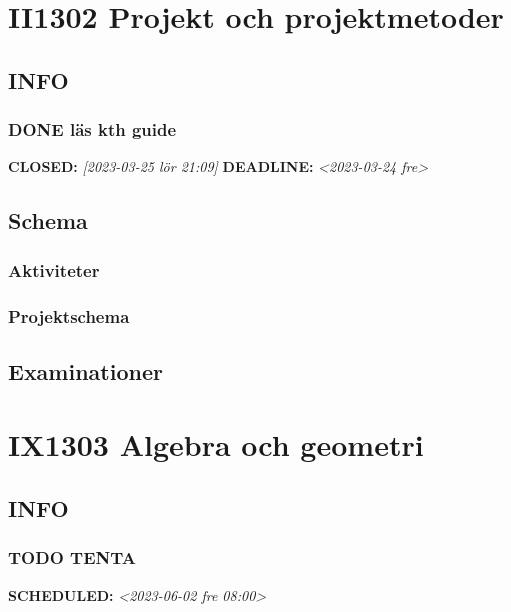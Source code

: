 \documentclass[11pt]{article}
\begin{document}
\section{II1302 Projekt och projektmetoder}
\label{sec:orgb0d36e4}
\subsection{INFO}
\label{sec:orgb77e735}
\subsubsection{{\bfseries\sffamily DONE} läs kth guide}
\label{sec:org5a29cd6}
\noindent\textbf{CLOSED:} \textit{[2023-03-25 lör 21:09] } \textbf{DEADLINE:} \textit{<2023-03-24 fre>}\\[0pt]
\subsection{Schema}
\label{sec:orgc224a5d}
\subsubsection{Aktiviteter}
\label{sec:org76070bd}

\subsubsection{Projektschema}
\label{sec:orgf36b0e5}

\subsection{Examinationer}
\label{sec:orgc8d9f15}

\section{IX1303 Algebra och geometri}
\label{sec:orgb2aa9b2}

\subsection{INFO}
\label{sec:org14ab935}

\subsubsection{{\bfseries\sffamily TODO} TENTA}
\label{sec:org1edc738}
\noindent\textbf{SCHEDULED:} \textit{<2023-06-02 fre 08:00>}\\[0pt]
\end{document}
